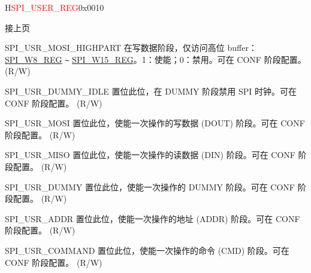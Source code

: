 \addtocounter{Regfloat}{-1}
\begin{register}{H}{\textcolor{red}{SPI\_USER\_REG}}{0x{}0010}
\begin{regdesc}\begin{reglist}
\item [接上页]

\label{fielddesc:SPIUSRMOSIHIGHPART}\item [SPI\_USR\_MOSI\_HIGHPART] 在写数据阶段，仅访问高位 buffer：\hyperref[regdesc:SPIW8REG]{SPI\_W8\_REG} \verb+~+ \hyperref[regdesc:SPIW15REG]{SPI\_W15\_REG}。1：使能；0：禁用。可在 CONF 阶段配置。 (R/W)
\label{fielddesc:SPIUSRDUMMYIDLE}\item [SPI\_USR\_DUMMY\_IDLE] 置位此位，在 DUMMY 阶段禁用 SPI 时钟。可在 CONF 阶段配置。 (R/W)
\label{fielddesc:SPIUSRMOSI}\item [SPI\_USR\_MOSI] 置位此位，使能一次操作的写数据 (DOUT) 阶段。可在 CONF 阶段配置。 (R/W)
\label{fielddesc:SPIUSRMISO}\item [SPI\_USR\_MISO] 置位此位，使能一次操作的读数据 (DIN) 阶段。可在 CONF 阶段配置。 (R/W)
\label{fielddesc:SPIUSRDUMMY}\item [SPI\_USR\_DUMMY] 置位此位，使能一次操作的 DUMMY 阶段。可在 CONF 阶段配置。 (R/W)
\label{fielddesc:SPIUSRADDR}\item [SPI\_USR\_ADDR] 置位此位，使能一次操作的地址 (ADDR) 阶段。可在 CONF 阶段配置。 (R/W)
\label{fielddesc:SPIUSRCOMMAND}\item [SPI\_USR\_COMMAND] 置位此位，使能一次操作的命令 (CMD) 阶段。可在 CONF 阶段配置。 (R/W)
\end{reglist}\end{regdesc}
\end{register}


